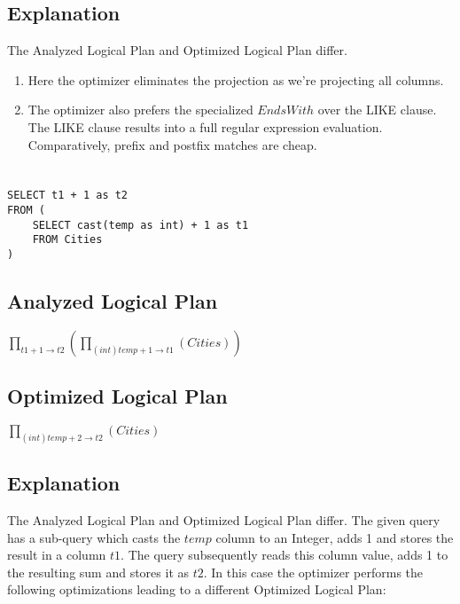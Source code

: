 \documentclass[12pt]{article}
\begin{document}
\subsection*{Explanation}

The Analyzed Logical Plan and Optimized Logical Plan differ. 

\begin{enumerate}

\item Here the optimizer eliminates the projection as we're projecting all columns. 

\item The optimizer also prefers the specialized $EndsWith$ over the LIKE clause. The LIKE clause results into a full regular expression evaluation. Comparatively, prefix and postfix matches are cheap.
\end{enumerate}

\newpage

\section{}
\begin{verbatim}
SELECT t1 + 1 as t2
FROM (
    SELECT cast(temp as int) + 1 as t1
    FROM Cities
)
\end{verbatim}

\subsection*{Analyzed Logical Plan}
$\prod_{t1 + 1 \rightarrow t2} ( \prod_{(int)temp + 1 \rightarrow t1} (Cities) )$

\subsection*{Optimized Logical Plan}
$\prod_{(int)temp + 2 \rightarrow t2}(Cities)$

\subsection*{Explanation}

The Analyzed Logical Plan and Optimized Logical Plan differ. The given query has a sub-query which casts the $temp$ column to an Integer, adds 1 and stores the result in a column $t1$. The query subsequently reads this column value, adds 1 to the resulting sum and stores it as $t2$. In this case the optimizer performs the following optimizations leading to a different Optimized Logical Plan:
\end{document}
